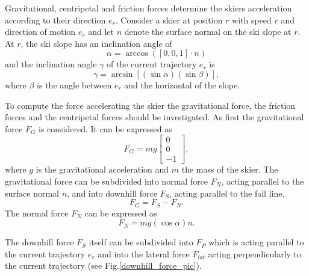 \documentclass[12pt,a4paper,twoside]{book}
\begin{document}
Gravitational, centripetal and friction forces determine the skiers acceleration according to their direction $e_{\dot{r}}$. Consider a skier at position $r$ with speed $\dot{r}$ and direction of motion $e_{\dot{r}}$ and let $n$ denote the surface normal on the ski slope at $r$. At $r$, the ski slope has an inclination angle of
\begin{equation}
\alpha =\arccos(\left[0,0,1\right] \cdot n)
\end{equation}
and the inclination angle $\gamma$ of the current trajectory $e_{\dot{r}}$ is
\begin{equation}\label{incl_angle}
\gamma =\arcsin[(\sin \alpha )(\sin \beta )],
\end{equation}
where $\beta$ is the angle between $e_{\dot{r}}$ and the horizontal of the slope.

To compute the force accelerating the skier the gravitational force, the friction forces and the centripetal forces should be investigated. As first the gravitational force $F_G$ is considered. It can be expressed as
\begin{equation}
F_G=mg\left[\begin{matrix}0\\0\\-1\end{matrix}\right],
\end{equation}
where $g$ is the gravitational acceleration and $m$ the mass of the skier. The gravitational force can be subdivided into normal force $F_N$, acting parallel to the surface normal $n$, and into downhill force $F_S$, acting parallel to the fall line.
\begin{equation}\label{downhill_force}
F_G=F_S-F_N.
\end{equation}
The normal force $F_N$ can be expressed as
\begin{equation}
F_N=mg(\cos \alpha )n.
\end{equation}

The downhill force $F_S$ itself can be subdivided into $F_P$ which is acting parallel to the current trajectory $e_{\dot{r}}$ and into the lateral force $F_{lat}$ acting perpendicularly to the current trajectory (see Fig.\ref{downhill_force_pic}).
\end{document}

